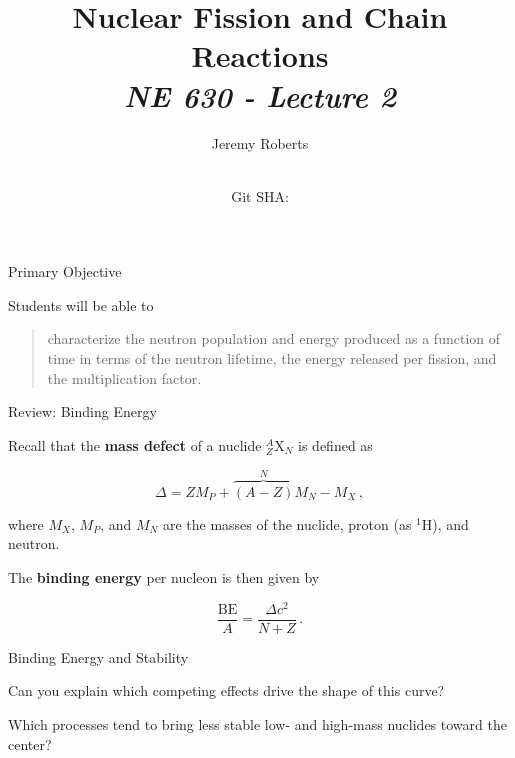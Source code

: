 \documentclass[aspectratio=1610]{beamer}
\title{Nuclear Fission and Chain Reactions\\
       {\small\it NE 630 - Lecture 2}}
\date{ \\ {\footnotesize Git SHA: }}
\author{Jeremy Roberts}
\begin{document}
\begin{frame}
\titlepage
\end{frame}
 
 
\begin{frame}{Primary Objective}

Students will be able to 

\vfill


\begin{quote}
\textcolor{wcprimary}{characterize the neutron population and energy produced
as a function of time in terms of the neutron lifetime, 
the energy released per fission, and 
the multiplication factor.}
\end{quote}

\vfill 

\end{frame}

\begin{frame}{Review: Binding Energy}

Recall that the {\bf mass defect} of a nuclide ${}^A_Z$X$_N$ is defined as 

\begin{equation*}
 \Delta = Z M_P + \overbrace{(A-Z)}^{N} M_N - M_X \, ,
 \tag{FNRP 1.18}
\end{equation*}

where $M_X$, $M_P$, and $M_N$ are the masses of the nuclide, 
proton (as ${}^1$H), and neutron.

\pause
\vfill 

The {\bf binding energy} per nucleon is then given by 

\begin{equation*}
  \frac{\text{BE}}{A} = \frac{\Delta c^2}{N+Z} \, .
  \tag{FNRP 1.19}
\end{equation*}

\end{frame}

\begin{frame}{Binding Energy and Stability}
 
\begin{figure}[h!]
    \centering
    \resizebox{\textwidth}{!}{}
\end{figure}

\vfill

Can you explain which competing effects drive the shape of this curve?

\vfill

Which processes tend to bring less stable low- and high-mass 
nuclides toward the center?

\end{frame}
\end{document}
